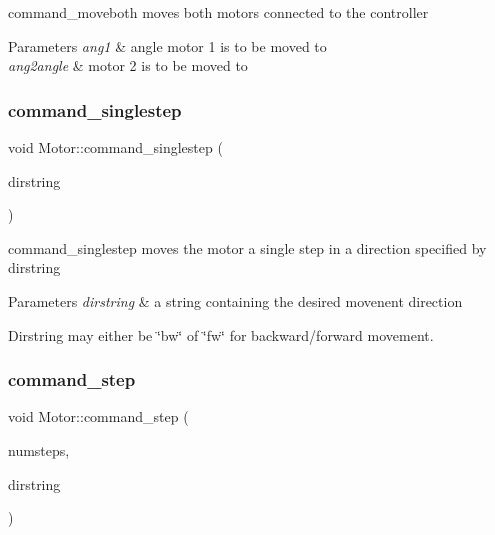 command\+\_\+moveboth moves both motors connected to the controller 


\begin{DoxyParams}{Parameters}
{\em ang1} & angle motor 1 is to be moved to \\
\hline
{\em ang2angle} & motor 2 is to be moved to \\
\hline
\end{DoxyParams}
\mbox{\label{classMotor_ae052b079f5bd433c3561eb8b6d772b80}} 
\subsubsection{\texorpdfstring{command\+\_\+singlestep}{command\_singlestep}}
{\footnotesize\ttfamily void Motor\+::command\+\_\+singlestep (\begin{DoxyParamCaption}\item[{Q\+String}]{dirstring }\end{DoxyParamCaption})\hspace{0.3cm}{\ttfamily [slot]}}



command\+\_\+singlestep moves the motor a single step in a direction specified by dirstring 


\begin{DoxyParams}{Parameters}
{\em dirstring} & a string containing the desired movenent direction\\
\hline
\end{DoxyParams}
Dirstring may either be \char`\"{}bw\char`\"{} of \char`\"{}fw\char`\"{} for backward/forward movement. \mbox{\label{classMotor_aafbe8e02e29d2a81287747ae09b3d9fa}} 
\subsubsection{\texorpdfstring{command\+\_\+step}{command\_step}}
{\footnotesize\ttfamily void Motor\+::command\+\_\+step (\begin{DoxyParamCaption}\item[{uint16\+\_\+t}]{numsteps,  }\item[{Q\+String}]{dirstring }\end{DoxyParamCaption})\hspace{0.3cm}{\ttfamily [slot]}}



